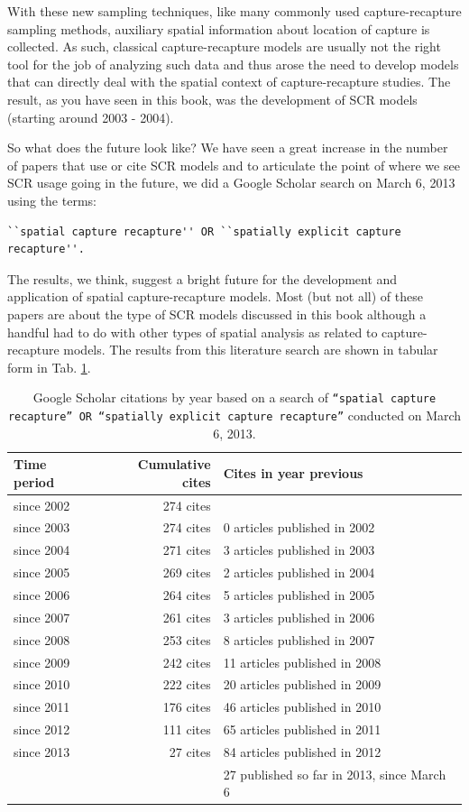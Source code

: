With these new sampling techniques, like many commonly used capture-recapture
sampling methods,
auxiliary spatial information about location of capture is collected. As such, classical capture-recapture
models are usually not the right tool for the job of analyzing such data and thus arose the need to develop
models that can directly deal with the
spatial context of capture-recapture studies.
The result, as you have seen in this book, was the development of SCR models (starting around
2003 - 2004).

So what does the future look like? We have seen a great increase in the number of papers that use or cite SCR models and to
articulate the point of where we see SCR usage going in the future, we did a Google Scholar search on
March 6, 2013 using the terms:
\begin{small}
\begin{verbatim}
``spatial capture recapture'' OR ``spatially explicit capture recapture''.
\end{verbatim}
\end{small}
The results, we think, suggest a bright future
for the development and application of spatial capture-recapture
models. Most (but not all) of these papers are about the type of SCR models
discussed in this book although a handful had to
do with other types of spatial analysis as related to
capture-recapture models.
The results from this literature search are shown
in tabular form in Tab.
\ref{last.tab.cites}.

\begin{table}[ht]
\caption{Google Scholar citations by year based on a search of
\mbox{\tt ``spatial capture recapture'' OR ``spatially explicit
capture recapture''} conducted on March 6, 2013.
}
\begin{tabular}{lrl} \hline \hline
Time period & Cumulative cites & Cites in year previous \\ \hline
since 2002 & 274 cites & \\
since 2003 & 274 cites &0 articles published in 2002 \\
since 2004 & 271 cites &3 articles published in 2003 \\
since 2005 & 269 cites &2 articles published in 2004 \\
since 2006 & 264 cites &5 articles published in 2005 \\
since 2007 & 261 cites &3 articles published in 2006 \\
since 2008 & 253 cites &8 articles published in 2007 \\
since 2009 & 242 cites &11 articles published in 2008 \\
since 2010 & 222 cites &20 articles published in 2009 \\
since 2011 & 176 cites &46 articles published in 2010 \\
since 2012 & 111 cites &65 articles published in 2011 \\
since 2013 & 27 cites &84 articles published in 2012 \\
& &27 published so far in 2013, since March 6
\\ \hline
\end{tabular}
\label{last.tab.cites}
\end{table}


